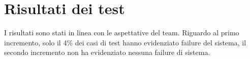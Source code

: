 \chapter{Risultati dei test}
I risultati sono stati in linea con le aspettative del team.
Riguardo al primo incremento, solo il 4\% dei casi di test hanno evidenziato failure del sistema, il secondo incremento non ha evidenziato nessuna failure di sistema.